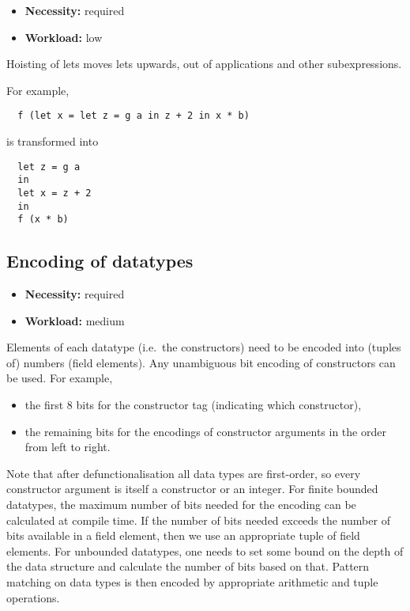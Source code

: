 \documentclass[final]{msc}
\begin{document}
\begin{itemize}
\item {\bf Necessity:} required
\item {\bf Workload:} low
\end{itemize}

\noindent Hoisting of lets moves lets upwards, out of applications and
other subexpressions.

\medskip

\noindent For example,
\begin{verbatim}
  f (let x = let z = g a in z + 2 in x * b)
\end{verbatim}
is transformed into
\begin{verbatim}
  let z = g a
  in
  let x = z + 2
  in
  f (x * b)
\end{verbatim}

\subsection{Encoding of datatypes}

\begin{itemize}
\item {\bf Necessity:} required
\item {\bf Workload:} medium
\end{itemize}

Elements of each datatype (i.e.~the constructors) need to be encoded
into (tuples of) numbers (field elements). Any unambiguous bit
encoding of constructors can be used. For example,
\begin{itemize}
\item the first 8 bits for the constructor tag (indicating which
  constructor),
\item the remaining bits for the encodings of constructor arguments in
  the order from left to right.
\end{itemize}
Note that after defunctionalisation all data types are first-order, so
every constructor argument is itself a constructor or an integer. For finite bounded datatypes, the maximum number of bits
needed for the encoding can be calculated at compile time. If the
number of bits needed exceeds the number of bits available in a field
element, then we use an appropriate tuple of field elements. For
unbounded datatypes, one needs to set some bound on the depth of the
data structure and calculate the number of bits based on that. Pattern
matching on data types is then encoded by appropriate arithmetic and
tuple operations.
\end{document}
